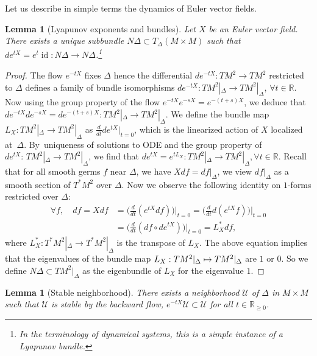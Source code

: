 \documentclass[10pt]{amsart}
\let\pazocal\mathscr
\def\mto{\mathchoice{\longmapsto}{\mapsto}{\mapsto}{\mapsto}}
\newtheorem{lemma}[theorem]{Lemma}
\theoremstyle{definition}
\let\euler X
\DeclareMathOperator\id{id}
\begin{document}
Let us describe in simple terms the dynamics of Euler vector fields.
\begin{lemma}[{Lyapunov exponents and bundles}]
Let $\euler$ be an Euler vector field. There exists a unique subbundle
$N\Delta\subset T_\Delta \left(M\times M\right)$ such that
$de^{t\euler}=e^{t}\id: N\Delta\to N\Delta$.\footnote{In the terminology of dynamical systems, this is a simple instance of a Lyapunov
bundle.}
\end{lemma}

\begin{proof}
The flow $e^{-t\euler}$ fixes $\Delta$
hence the differential $de^{-t\euler}:TM^2\to TM^2$ restric\-ted to $\Delta$ defines a family of bundle isomorphisms
$de^{-t\euler}: T M^2|_\Delta \to T M^2|_\Delta$, $\forall t\in \mathbb{R}$.
Now using the group property of the flow $e^{-t\euler}e^{-s\euler}=e^{-(t+s)\euler}$,
we deduce that $de^{-tX}de^{-sX}=de^{-(t+s)\euler}:T M^2|_\Delta \to T M^2|_\Delta$.
We define the bundle map $L_\euler:T M^2|_\Delta \to T M^2|_\Delta$ as
$\frac{d}{dt}de^{t\euler}|_{t=0}$, which is the linearized action of $\euler$ localized at~$\Delta$. By~uniqueness of solutions to ODE and the group property of \hbox{$de^{t\euler}{:}\,T M^2|_\Delta\!\to\!T M^2|_\Delta$}, we find that $de^{t\euler}=e^{tL_\euler}:T M^2|_\Delta \to T M^2|_\Delta, \forall t\in \mathbb{R}$. Recall that for all smooth germs $f$ near $\Delta$, we have
$Xdf=df|_\Delta$, we view $df|_\Delta$ as a smooth section of $T^*M^2$ over $\Delta$. Now we observe the following identity on $1$-forms restricted over $\Delta$:
\begin{align*}
\forall f,\quad df=
\euler df&= \Big(\frac{d}{dt}
\left(e^{t\euler}df\right)\Big)\big|_{t=0}=\Big(\frac{d}{dt}
d\left(e^{t\euler}f\right)\Big)\big|_{t=0}\\
&=\Big(\frac{d}{dt}
\left(df\circ de^{t\euler}\right)\Big)\big|_{t=0}=L_\euler^* df,
\end{align*}
where $L_\euler^*:T^*M^2|_\Delta\to T^*M^2|_\Delta$ is the transpose of {$L_\euler$}.
The above equation implies that the eigenvalues of the bundle map $L_\euler:TM^2|_\Delta\mto TM^2|_\Delta$ are {$1$ or $0$}. So we define $N\Delta\subset TM^2|_\Delta$ as the eigenbundle of $L_\euler$ for the eigenvalue $1$.
\end{proof}

\begin{lemma}[Stable neighborhood]\label{l:stable}
There exists a neighborhood $\pazocal{U}$ of $\Delta$ in $M\times M$ such that $\pazocal{U}$ is stable by the backward flow, \ie $e^{-t\euler}\pazocal{U}\subset \pazocal{U}$ for all $t\in \mathbb{R}_{\geqslant 0}$.
\end{lemma}
\end{document}
